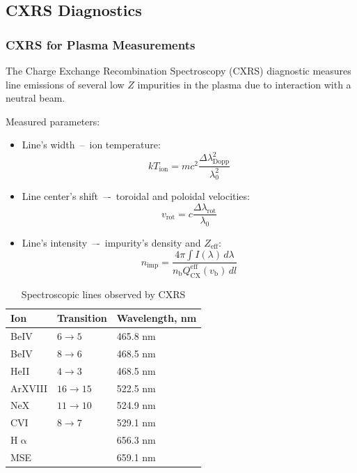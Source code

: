 \documentclass[../main.tex]{subfiles}
\begin{document}
\subsection{CXRS Diagnostics}
\subsubsection{CXRS for Plasma Measurements}
The Charge Exchange Recombination Spectroscopy (CXRS) diagnostic measures line emissions of several low $Z$ impurities in the plasma due to interaction with a neutral beam.

Measured parameters:
\begin{itemize}
    \item Line’s width~--~ion temperature:
          \begin{equation}
              \label{eq:ion_temperature}
              kT_\text{ion} = mc^2 \dfrac{{\Delta\lambda}_\text{Dopp}^2}{\lambda_{0}^{2}}
          \end{equation}

    \item Line center’s shift~–-~toroidal and poloidal velocities:
          \begin{equation}
              \label{eq:rotational_velocity}
              v_\text{rot} = c \dfrac{\Delta\lambda_\text{rot}}{\lambda_{0}}
          \end{equation}

    \item Line’s intensity~–-~impurity's density and $Z_\text{eff}$:
          \begin{equation}
              \label{eq:impurity_density}
              n_\text{imp} = \dfrac{4\pi \int I(\lambda)\, d\lambda}{n_\text{b} Q_\text{CX}^\text{eff}(v_\text{b})\, dl}
          \end{equation}

\end{itemize}

\begin{table}[ht]
    \centering
    \begin{tabular}[]{l l l}
        \toprule
        Ion         & Transition & Wavelength, nm \\
        \midrule
        BeIV        & $6\to5$    & 465.8 nm       \\
        BeIV        & $8\to6$    & 468.5 nm       \\
        HeII        & $4\to3$    & 468.5 nm       \\
        \midrule
        ArXVIII     & $16\to15$  & 522.5 nm       \\
        NeX         & $11\to10$  & 524.9 nm       \\
        CVI         & $8\to7$    & 529.1 nm       \\
        \midrule
        H$\upalpha$ &            & 656.3 nm       \\
        MSE         &            & 659.1 nm       \\
        \bottomrule
    \end{tabular}
    \caption{Spectroscopic lines observed by CXRS}%
    \label{tab:cxrs_lines}
\end{table}
\end{document}
